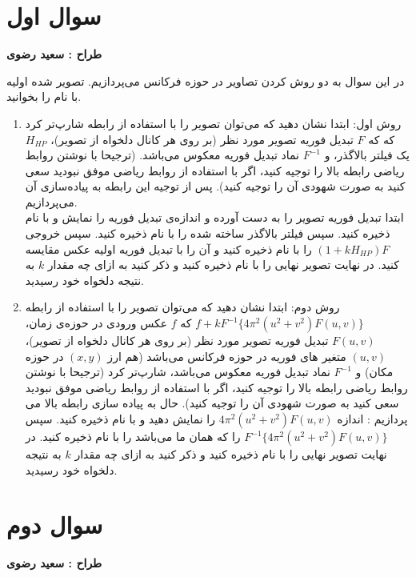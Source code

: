 \documentclass[a4paper]{article}
\begin{document}
\clearpage
\section*{سوال اول}
\textbf{طراح :‌ سعید رضوی}
\vspace{0.5cm}

در این سوال به دو روش
 کردن تصاویر در حوزه فرکانس می‌پردازیم. تصویر
 شده اولیه با نام 
را بخوانید.
\begin{enumerate}
	\item 
روش اول: ابتدا نشان دهید که می‌توان تصویر را با استفاده از رابطه
شارپ‌تر کرد که
که $F$ تبدیل فوریه تصویر مورد نظر (بر روی هر کانال دلخواه از تصویر)، $ H_{HP}$ یک فیلتر بالاگذر، و $F^{-1}$ نماد تبدیل فوریه معکوس می‌باشد. (ترجیحا با نوشتن روابط ریاضی رابطه بالا را توجیه کنید، اگر با استفاده از روابط ریاضی موفق نبودید سعی کنید به صورت شهودی آن را توجیه کنید). پس از توجیه این رابطه به پیاده‌سازی آن می‌پردازیم.
 \\
ابتدا تبدیل فوریه‌ تصویر را به دست آورده و اندازه‌ی تبدیل فوریه‌ را نمایش و با نام
ذخیره کنید.
سپس فیلتر بالاگذر ساخته شده را با نام 
 ذخیره کنید. سپس خروجی
$ (1+kH_{HP})F$
 را با نام 
 ذخیره کنید و آن را با تبدیل فوریه اولیه عکس مقایسه کنید. در نهایت تصویر نهایی را با نام 
 ذخیره کنید و ذکر کنید به ازای چه مقدار $ k $ به نتیجه دلخواه خود رسیدید. 
\item
روش دوم: ابتدا نشان دهید که می‌توان تصویر را با استفاده از رابطه 
$f + kF^{-1}\{4\pi^2(u^2+v^2)F(u,v)\}$
 که 
$ f $
 عکس ورودی در حوزه‌ی زمان،
$F(u,v)$ 
 تبدیل فوریه تصویر مورد نظر (بر روی هر کانال دلخواه از تصویر)، 
$(u ,v)$
  متغیر های فوریه در حوزه فرکانس می‌باشد (هم ارز $(x,y)$ در حوزه مکان) و 
$F^{-1}$
 نماد تبدیل فوریه معکوس می‌باشد، شارپ‌تر کرد (ترجیحا با نوشتن روابط ریاضی رابطه بالا را توجیه کنید، اگر با استفاده از روابط ریاضی موفق نبودید سعی کنید به صورت شهودی آن را توجیه کنید). حال به پیاده سازی رابطه بالا می پردازیم :
اندازه 
$ 4\pi^2(u^2+v^2)F(u,v) $ 
را نمایش دهید و با نام 
 ذخیره کنید. 
 سپس
$F^{-1}\{4\pi^2(u^2+v^2)F(u,v)\}$
 را که همان
ما می‌باشد را با نام  
ذخیره کنید. در نهایت تصویر نهایی را با نام  
ذخیره کنید و ذکر کنید به ازای چه مقدار $k$ به نتیجه دلخواه خود رسیدید.
\end{enumerate}


\section*{سوال دوم}
\textbf{طراح : سعید رضوی }
\vspace{0.3cm}
\end{document}
